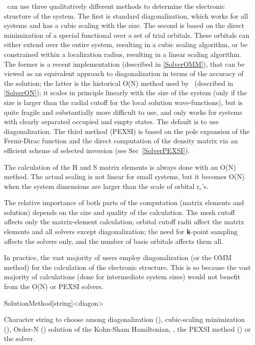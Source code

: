 \siesta\ can use three qualitatively different methods to determine
the electronic structure of the system. The first is standard
diagonalization, which works for all systems and has a cubic scaling
with the size. The second is based on
the direct minimization of a special functional over a set of
trial orbitals. These orbitals can either extend over the entire system,
resulting in a cubic scaling algorithm, or be constrained within a
localization radius, resulting in a linear scaling algorithm. The former
is a recent implementation (described in \ref{SolverOMM}), that can
be viewed as an equivalent approach to diagonalization in terms of the
accuracy of the solution; the latter is the historical O(N) method used by
\siesta\ (described in \ref{SolverON}); it scales in principle
linearly with the size of the system (only if the size is larger than
the radial cutoff for the local solution wave-functions), but is quite
fragile and substantially more difficult to use, and only works for
systems with clearly separated occupied and empty states. The default is
to use diagonalization. The third method (PEXSI) is based on the
pole expansion of the Fermi-Dirac function and the direct computation
of the density matrix via an efficient scheme of selected
inversion (see Sec~\ref{SolverPEXSI}).

The calculation of the H and S matrix elements is always done with an
O(N) method. The actual scaling is not linear for small systems, but
it becomes O(N) when the system dimensions are larger than the scale
of orbital r$_c$'s.

The relative importance of both parts of the computation (matrix
elements and solution) depends on the size and quality of the
calculation. The mesh cutoff affects only the matrix-element
calculation; orbital cutoff radii affect the matrix elements and all
solvers except diagonalization; the need for \textbf{k}-point sampling
affects the solvers only, and the number of basis orbitals affects
them all.

In practice, the vast majority of users employ diagonalization (or the
OMM method) for the calculation of the electronic structure. This is
so because the vast majority of calculations (done for intermediate
system sizes) would not benefit from the O(N) or PEXSI solvers.

\begin{fdfentry}{SolutionMethod}[string]<diagon>

  Character string to choose among diagonalization (),
  cubic-scaling minimization (), Order-N ()
  solution of the Kohn-Sham Hamiltonian, , the
  PEXSI method () or the  solver.
  
\end{fdfentry}


